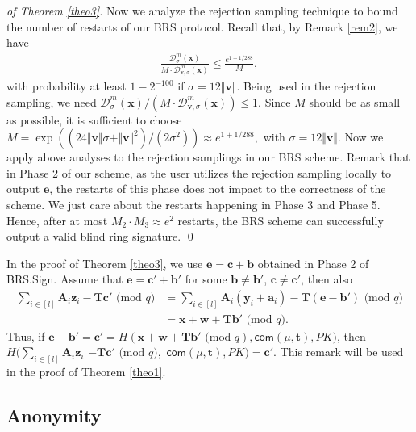 \documentclass[runningheads]{llncs}
\begin{document}
\begin{proof}[of Theorem \ref{theo3}]
	Now we analyze the rejection sampling technique to bound the number of restarts of our \textsf{BRS} protocol. Recall that, by Remark \ref{rem2}, we have \begin{align*}
	\frac{\mathcal{D}_{\sigma}^m(\mathbf{x})}{M \cdot \mathcal{D}^m_{\mathbf{v},\sigma}(\mathbf{x})} \leq \frac{e^{1+1/288}}{M},
	\end{align*}
	with probability at least $1-2^{-100}$ if $\sigma=12\Vert  \mathbf{v}\Vert$.
	Being used in the rejection sampling, we need $\mathcal{D}_{\sigma}^m(\mathbf{x})/(M \cdot \mathcal{D}^m_{\mathbf{v},\sigma}(\mathbf{x}))\leq 1$. Since $M$ should be as small as possible, it is sufficient to choose $M=\exp\left((24\Vert  \mathbf{v}\Vert\sigma+\Vert  \mathbf{v}\Vert^2)/(2\sigma^2)\right) \approx e^{1+1/288},$ with $\sigma=12\Vert  \mathbf{v}\Vert$.
	Now we apply above analyses to the rejection samplings in our \textsf{BRS} scheme. Remark that in Phase 2 of our scheme, as the user utilizes the rejection sampling locally to output $\mathbf{e}$, the restarts of this phase does not impact to the correctness of the scheme. We just care about the restarts happening in Phase 3 and Phase 5. Hence, after at most $M_2\cdot M_3 \approx e^2$ restarts, the \textsf{BRS} scheme can successfully output a valid blind ring signature. \qed
\end{proof}

\begin{remark}\label{rem5}
	In the proof of Theorem \ref{theo3}, we use $\mathbf{e}=\mathbf{c}+\mathbf{b}$ obtained in Phase 2 of \textsf{BRS.Sign}. Assume that  $\mathbf{e}=\mathbf{c}'+\mathbf{b}'$ for some $\mathbf{b}\neq \mathbf{b}'$, $\mathbf{c}\neq \mathbf{c}'$, then also
		\begin{align*}\sum_{i \in [l]}\mathbf{A}_i\mathbf{z}_i -\mathbf{T}\mathbf{c}'\text{ (mod } q)&=\sum_{i \in [l]}\mathbf{A}_i(\mathbf{y}_i+\mathbf{a}_i) -\mathbf{T}(\mathbf{e}-\mathbf{b}')\text{ (mod } q)\\
	&=\mathbf{x}+\mathbf{w}+\mathbf{T}\mathbf{b}' \text{ (mod } q).
	\end{align*}
	Thus, if  $\mathbf{e}-\mathbf{b}'=\mathbf{c}'=H(\mathbf{x}+\mathbf{w}+\mathbf{T}\mathbf{b}' \text{ (mod } q), \mathsf{com}(\mu, \mathbf{t}), PK)$, then $H(\sum_{i \in [l]}\mathbf{A}_i\mathbf{z}_i $ $-\mathbf{T}\mathbf{c}'\text{ (mod } q),$ $ \mathsf{com}(\mu, \mathbf{t}), PK)=\mathbf{c}'$. This remark will be used in the proof of Theorem \ref{theo1}.
\end{remark}


\subsection{Anonymity} 
\end{document}
